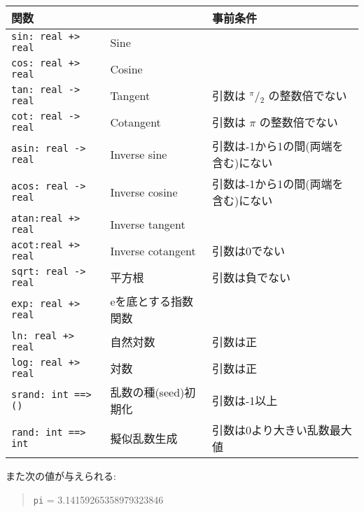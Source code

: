 \documentclass[\pformat,12pt]{jarticle}
\begin{document}
\begin{center}
\begin{tabular}{|l|l|p{6cm}|}\hline
\multicolumn{2}{|l|}{\bf 関数} & \bf 事前条件\\ \hline
\verb/sin: real +> real/ & Sine &  \index{Sine} \\ \hline
\verb/cos: real +> real/ & Cosine &  \index{Cosine} \\ \hline
\verb/tan: real -> real/ & Tangent & 引数は $^\pi\!/\!_2$ の整数倍でない\index{Tangent} \\ \hline 
\verb/cot: real -> real/ & Cotangent & 引数は $\pi$ の整数倍でない\index{Cotangent} \\ \hline
\verb/asin: real -> real/ & Inverse sine & 引数は-1から1の間(両端を含む)にない
                                           \index{Inverse sine}\\ \hline
\verb/acos: real -> real/ & Inverse cosine & 引数は-1から1の間(両端を含む)にない
                                      \index{Inverse cosine}\\ \hline
\verb/atan:real +> real/ & Inverse tangent & \index{Inverse tangent}\\ \hline
\verb/acot:real +> real/ & Inverse cotangent & 引数は0でない
					\index{Inverse cotangent}\\ \hline
\verb/sqrt: real -> real/ & 平方根 & 引数は負でない
                                          \index{平方根}\\ \hline
\verb/exp: real +> real/ & eを底とする指数関数 & 
                                          \index{指数関数}\\ \hline
\verb/ln: real +> real/ & 自然対数& 引数は正
                                          \index{自然対数}\\ \hline
\verb/log: real +> real/ & 対数 & 引数は正
                                          \index{対数}\\ \hline
\verb/srand: int ==> ()/ & 乱数の種(seed)初期化 & 引数は-1以上
                                          \index{乱数の種(seed)初期化}\\ \hline
\verb/rand: int ==> int/ & 擬似乱数生成 & 引数は0より大きい乱数最大値
                                          \index{擬似乱数生成}\\ \hline

\end{tabular}
\end{center}

また次の値が与えられる:

\begin{quote}
\texttt{pi} = 3.14159265358979323846
\end{quote}
\end{document}
